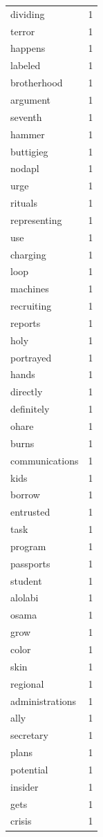 \begin{tabular}{lr}
dividing & 1 \\
terror & 1 \\
happens & 1 \\
labeled & 1 \\
brotherhood & 1 \\
argument & 1 \\
seventh & 1 \\
hammer & 1 \\
buttigieg & 1 \\
nodapl & 1 \\
urge & 1 \\
rituals & 1 \\
representing & 1 \\
use & 1 \\
charging & 1 \\
loop & 1 \\
machines & 1 \\
recruiting & 1 \\
reports & 1 \\
holy & 1 \\
portrayed & 1 \\
hands & 1 \\
directly & 1 \\
definitely & 1 \\
ohare & 1 \\
burns & 1 \\
communications & 1 \\
kids & 1 \\
borrow & 1 \\
entrusted & 1 \\
task & 1 \\
program & 1 \\
passports & 1 \\
student & 1 \\
alolabi & 1 \\
osama & 1 \\
grow & 1 \\
color & 1 \\
skin & 1 \\
regional & 1 \\
administrations & 1 \\
ally & 1 \\
secretary & 1 \\
plans & 1 \\
potential & 1 \\
insider & 1 \\
gets & 1 \\
crisis & 1 \\

\end{tabular}
